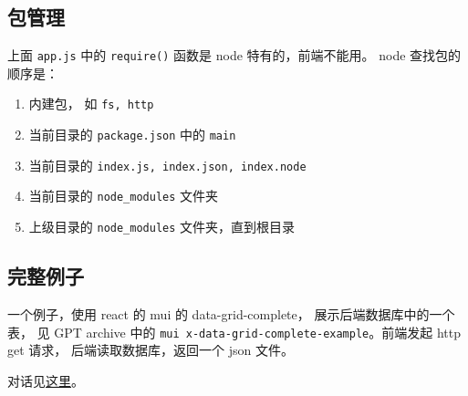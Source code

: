 \subsection{包管理}

上面 \verb`app.js` 中的 \verb`require()` 函数是 node 特有的，前端不能用。
node 查找包的顺序是：
\begin{enumerate}
\item 内建包， 如 \verb`fs, http`
\item 当前目录的 \verb`package.json` 中的 \verb`main`
\item 当前目录的 \verb`index.js, index.json, index.node`
\item 当前目录的 \verb`node_modules` 文件夹
\item 上级目录的 \verb`node_modules` 文件夹，直到根目录
\end{enumerate}

\subsection{完整例子}
一个例子，使用 react 的 mui 的 data-grid-complete， 展示后端数据库中的一个表， 见 GPT archive 中的 \verb`mui x-data-grid-complete-example`。前端发起 http get 请求， 后端读取数据库，返回一个 json 文件。

对话见\href{https://chatgpt.com/share/0c404191-f992-4422-9527-56edc75b7415}{这里}。
